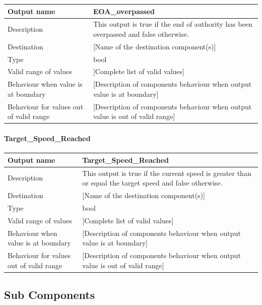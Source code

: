 \begin{longtable}{p{}p{}}
\toprule
Output name				& EOA\_overpassed \\
\midrule
Description				& This output is true if the end of authority has been overpassed and false otherwise. \\
\midrule
Destination				& [Name of the destination component(s)] \\ 
\midrule
Type					& bool \\
\midrule
Valid range of values	& [Complete list of valid values] \\
\midrule
Behaviour when value is at boundary	& [Description of components behaviour when output value is at boundary] \\
\midrule
Behaviour for values out of valid range	& [Description of components behaviour when output value is out of valid range] \\
\bottomrule
\end{longtable}


\paragraph{Target\_Speed\_Reached}

\begin{longtable}{p{}p{}}
\toprule
Output name				& Target\_Speed\_Reached \\
\midrule
Description				& This output is true if the current speed is greater than or equal the target speed and false otherwise. \\
\midrule
Destination				& [Name of the destination component(s)] \\ 
\midrule
Type					& bool \\
\midrule
Valid range of values	& [Complete list of valid values] \\
\midrule
Behaviour when value is at boundary	& [Description of components behaviour when output value is at boundary] \\
\midrule
Behaviour for values out of valid range	& [Description of components behaviour when output value is out of valid range] \\
\bottomrule
\end{longtable}


\subsection{Sub Components}\label{s:trainsupervision_subcomponents}

